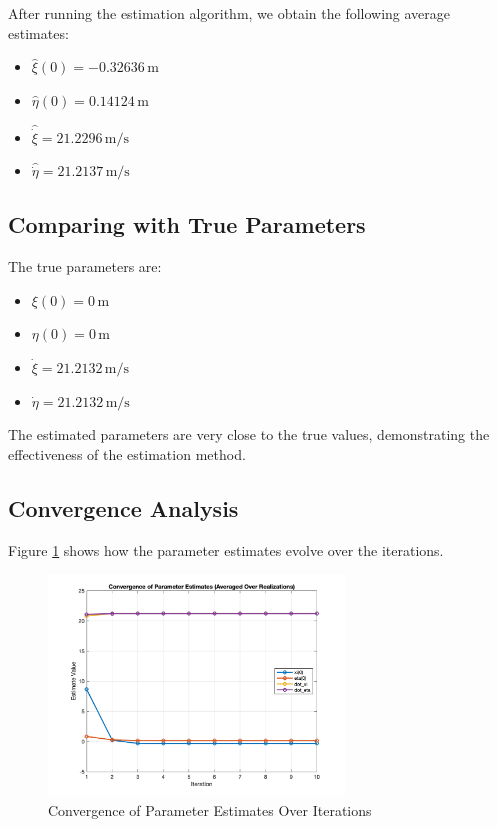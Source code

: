 \documentclass[12pt]{article}
\begin{document}
After running the estimation algorithm, we obtain the following average estimates:

\begin{itemize}
    \item \( \hat{\xi}(0) = -0.32636\, \text{m} \)
    \item \( \hat{\eta}(0) = 0.14124\, \text{m} \)
    \item \( \hat{\dot{\xi}} = 21.2296\, \text{m/s} \)
    \item \( \hat{\dot{\eta}} = 21.2137\, \text{m/s} \)
\end{itemize}

\subsection{Comparing with True Parameters}

The true parameters are:

\begin{itemize}
    \item \( \xi(0) = 0\, \text{m} \)
    \item \( \eta(0) = 0\, \text{m} \)
    \item \( \dot{\xi} = 21.2132\, \text{m/s} \)
    \item \( \dot{\eta} = 21.2132\, \text{m/s} \)
\end{itemize}

The estimated parameters are very close to the true values, demonstrating the effectiveness of the estimation method.

\subsection{Convergence Analysis}

Figure \ref{fig:convergence} shows how the parameter estimates evolve over the iterations.

\begin{figure}[H]
    \centering
    \includegraphics[width=0.7\textwidth]{convergence.png}
    \caption{Convergence of Parameter Estimates Over Iterations}
    \label{fig:convergence}
\end{figure}
\end{document}
